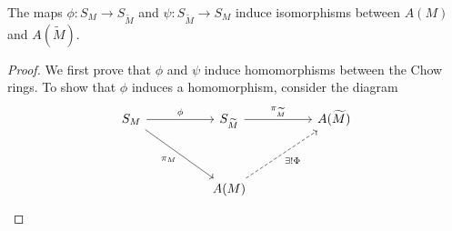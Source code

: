 \documentclass{puthesis-UG}
\begin{document}
\begin{thm}
	The maps $\phi : S_M \to S_{\widetilde{M}}$ and $\psi : S_{\widetilde{M}} \to S_M$ induce isomorphisms between $A(M)$ and $A(\widetilde{M})$. 
\end{thm}

\begin{proof}
	We first prove that $\phi$ and $\psi$ induce homomorphisms between the Chow rings. To show that $\phi$ induces a homomorphism, consider the diagram
	\[\begin{tikzcd}
	{S_M} && {S_{\widetilde{M}}} && {A(\widetilde{M})} \\
	\\
	&& {A(M)}
	\arrow["\phi", from=1-1, to=1-3]
	\arrow["{\pi_{\widetilde{M}}}", from=1-3, to=1-5]
	\arrow["{\pi_M}"', from=1-1, to=3-3]
	\arrow["{\exists ! \Phi}"', dashed, from=3-3, to=1-5]
\end{tikzcd}\]


\end{proof}
\end{document}
